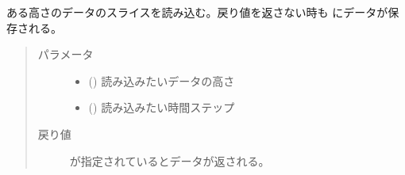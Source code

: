 \documentclass[letterpaper,10pt,dvipdfmx,report]{sphinxmanual}
\begin{document}

\begin{fulllineitems}
\label{\detokenize{io:read_qq_select}}
ある高さのデータのスライスを読み込む。戻り値を返さない時も  にデータが保存される。
\begin{quote}\begin{description}
\item[{パラメータ}] \leavevmode\begin{itemize}
\item {} 
 () \sphinxhyphen{}\sphinxhyphen{} 読み込みたいデータの高さ

\item {} 
 () \sphinxhyphen{}\sphinxhyphen{} 読み込みたい時間ステップ

\end{itemize}

\item[{戻り値}] \leavevmode
{} が指定されているとデータが返される。

\end{description}\end{quote}

\end{fulllineitems}

\end{document}
